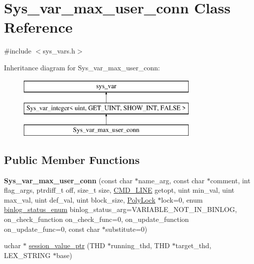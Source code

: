 \hypertarget{classSys__var__max__user__conn}{}\section{Sys\+\_\+var\+\_\+max\+\_\+user\+\_\+conn Class Reference}
\label{classSys__var__max__user__conn}


{\ttfamily \#include $<$sys\+\_\+vars.\+h$>$}

Inheritance diagram for Sys\+\_\+var\+\_\+max\+\_\+user\+\_\+conn\+:\begin{figure}[H]
\begin{center}
\leavevmode
\includegraphics[height=3.000000cm]{classSys__var__max__user__conn}
\end{center}
\end{figure}
\subsection*{Public Member Functions}
\begin{DoxyCompactItemize}
\item 
\mbox{\label{classSys__var__max__user__conn_a0b96973f3442db0820d2e5e2a0975d79}} 
{\bfseries Sys\+\_\+var\+\_\+max\+\_\+user\+\_\+conn} (const char $\ast$name\+\_\+arg, const char $\ast$comment, int flag\+\_\+args, ptrdiff\+\_\+t off, size\+\_\+t size, \mbox{\hyperlink{structCMD__LINE}{C\+M\+D\+\_\+\+L\+I\+NE}} getopt, uint min\+\_\+val, uint max\+\_\+val, uint def\+\_\+val, uint block\+\_\+size, \mbox{\hyperlink{classPolyLock}{Poly\+Lock}} $\ast$lock=0, enum \mbox{\hyperlink{classsys__var_a664520ec82191888717c86085bfa83ce}{binlog\+\_\+status\+\_\+enum}} binlog\+\_\+status\+\_\+arg=V\+A\+R\+I\+A\+B\+L\+E\+\_\+\+N\+O\+T\+\_\+\+I\+N\+\_\+\+B\+I\+N\+L\+OG, on\+\_\+check\+\_\+function on\+\_\+check\+\_\+func=0, on\+\_\+update\+\_\+function on\+\_\+update\+\_\+func=0, const char $\ast$substitute=0)
\item 
uchar $\ast$ \mbox{\hyperlink{classSys__var__max__user__conn_a414aef777e5b4471d23c53702682e15f}{session\+\_\+value\+\_\+ptr}} (T\+HD $\ast$running\+\_\+thd, T\+HD $\ast$target\+\_\+thd, L\+E\+X\+\_\+\+S\+T\+R\+I\+NG $\ast$base)
\end{DoxyCompactItemize}
